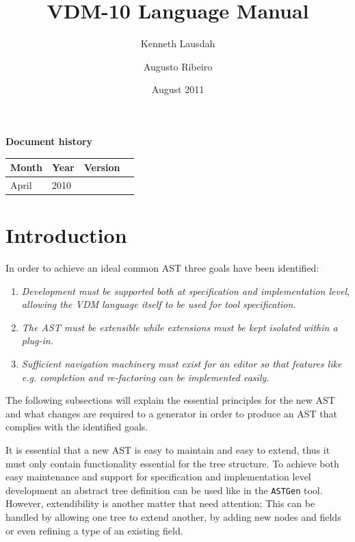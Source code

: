 \documentclass{overturerepchap}
\begin{document}
 
\title{VDM-10 Language Manual}
\author{ Kenneth Lausdah \and Augusto Ribeiro}

\date{August 2011}

\maketitle


{\textbf{Document history}}

\begin{tabular}{|l|l|l|l|}\hline
Month   & Year & Version \\ \hline
April   & 2010 &    \\ \hline
\end{tabular}

\tableofcontents
\newpage
\mbox{}
\newpage
{} 
\setcounter{page}{1}

\chapter{Introduction}
In order to achieve an ideal common AST three goals have been identified:
\begin{enumerate}
\item \textit{Development must be supported both at specification and implementation level, allowing the VDM language itself to be used for tool specification.}
\item \textit{The AST must be extensible while extensions must be kept isolated within a plug-in.}
\item \textit{Sufficient navigation machinery must exist for an editor so that features like e.g. completion and re-factoring can be implemented easily.}
\end{enumerate}
The following subsections will explain the essential principles for the new AST and what changes are required to a generator in order to produce an AST that complies with the identified goals.




It is essential that a new AST is easy to maintain and easy to extend, thus it must only contain functionality essential for the tree structure. To achieve both easy maintenance and support for specification and implementation level development an abstract tree definition can be used like in the \texttt{ASTGen} tool. However, extendibility is another matter that need attention; This can be handled by allowing one tree to extend another, by adding new nodes and fields or even refining a type of an existing field.
\end{document}
